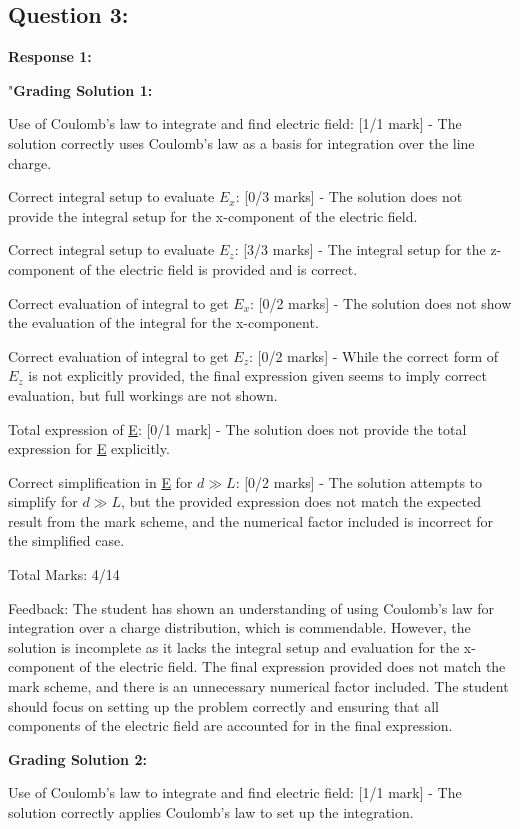 \documentclass[a4paper,11pt]{article}
\begin{document}
\subsection*{Question 3:}

\textbf{Response 1:}

"\textbf{Grading Solution 1:}

Use of Coulomb’s law to integrate and find electric field: [1/1 mark] - The solution correctly uses Coulomb’s law as a basis for integration over the line charge.

Correct integral setup to evaluate \( E_x \): [0/3 marks] - The solution does not provide the integral setup for the x-component of the electric field.

Correct integral setup to evaluate \( E_z \): [3/3 marks] - The integral setup for the z-component of the electric field is provided and is correct.

Correct evaluation of integral to get \( E_x \): [0/2 marks] - The solution does not show the evaluation of the integral for the x-component.

Correct evaluation of integral to get \( E_z \): [0/2 marks] - While the correct form of \( E_z \) is not explicitly provided, the final expression given seems to imply correct evaluation, but full workings are not shown.

Total expression of \underline{E}: [0/1 mark] - The solution does not provide the total expression for \underline{E} explicitly.

Correct simplification in \underline{E} for \( d \gg L \): [0/2 marks] - The solution attempts to simplify for \( d \gg L \), but the provided expression does not match the expected result from the mark scheme, and the numerical factor included is incorrect for the simplified case.

Total Marks: 4/14

Feedback:
The student has shown an understanding of using Coulomb's law for integration over a charge distribution, which is commendable. However, the solution is incomplete as it lacks the integral setup and evaluation for the x-component of the electric field. The final expression provided does not match the mark scheme, and there is an unnecessary numerical factor included. The student should focus on setting up the problem correctly and ensuring that all components of the electric field are accounted for in the final expression.

\textbf{Grading Solution 2:}

Use of Coulomb’s law to integrate and find electric field: [1/1 mark] - The solution correctly applies Coulomb's law to set up the integration.
\end{document}
